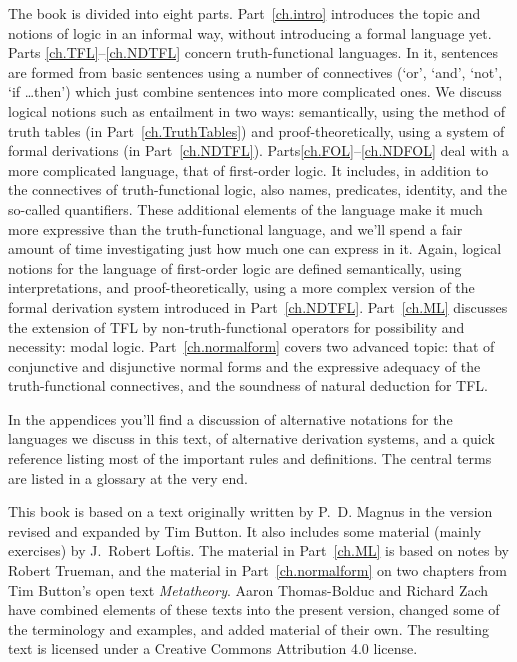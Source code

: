 The book is divided into eight parts. Part~\ref{ch.intro} introduces the topic and notions of logic in an informal way, without introducing a formal language yet.  Parts \ref{ch.TFL}--\ref{ch.NDTFL} concern truth-functional languages. In it, sentences are formed from basic sentences using a number of connectives (`or', `and', `not', `if \dots then') which just combine sentences into more complicated ones.  We discuss logical notions such as entailment in two ways: semantically, using the method of truth tables (in Part~\ref{ch.TruthTables}) and proof-theoretically, using a system of formal derivations (in Part~\ref{ch.NDTFL}).  Parts\ref{ch.FOL}--\ref{ch.NDFOL} deal with a more complicated language, that of first-order logic. It includes, in addition to the connectives of truth-functional logic, also names, predicates, identity, and the so-called quantifiers. These additional elements of the language make it much more expressive than the truth-functional language, and we'll spend a fair amount of time investigating just how much one can express in it.  Again, logical notions for the language of first-order logic are defined semantically, using interpretations, and proof-theoretically, using a more complex version of the formal derivation system introduced in Part~\ref{ch.NDTFL}.  Part~\ref{ch.ML} discusses the extension of TFL by non-truth-functional operators for possibility and necessity: modal logic. Part~\ref{ch.normalform} covers two advanced topic: that of conjunctive and disjunctive normal forms and the expressive adequacy of the truth-functional connectives, and the soundness of natural deduction for TFL.

In the appendices you'll find a discussion of alternative notations for the languages we discuss in this text, of alternative derivation systems, and a quick reference listing most of the important rules and definitions. The central terms are listed in a glossary at the very end.

This book is based on a text originally written by P.~D. Magnus in the version revised and expanded by Tim Button. It also includes some material (mainly exercises) by J.~Robert Loftis. The material in Part~\ref{ch.ML} is based on notes by Robert Trueman, and the material in Part~\ref{ch.normalform} on two chapters from Tim Button's open text \emph{Metatheory}. Aaron Thomas-Bolduc and Richard Zach have combined elements of these texts into the present version, changed some of the terminology and examples, and added material of their own.  The resulting text is licensed under a Creative Commons Attribution 4.0 license.
